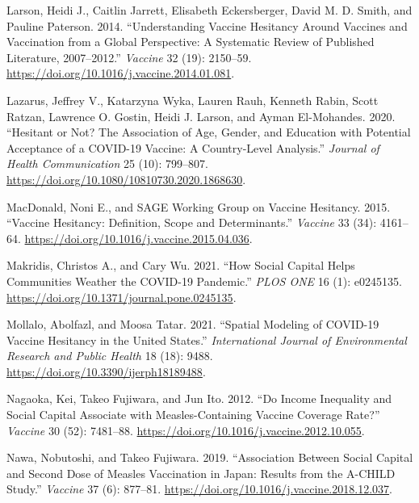 \documentclass[
]{article}
\newlength{\cslhangindent}
\newlength{\cslentryspacingunit} %
\newenvironment{CSLReferences}[2] %
 {%
  \setlength{\parindent}{0pt}
  \ifodd #1
  \let\oldpar\par
  \def\par{\hangindent=\cslhangindent\oldpar}
  \fi
  \setlength{\parskip}{#2\cslentryspacingunit}
 }%
 {}
\begin{document}
\begin{CSLReferences}{1}{0}
\leavevmode{}%
Larson, Heidi J., Caitlin Jarrett, Elisabeth Eckersberger, David M. D.
Smith, and Pauline Paterson. 2014. {``Understanding Vaccine Hesitancy
Around Vaccines and Vaccination from a Global Perspective: {A}
Systematic Review of Published Literature, 2007--2012.''} \emph{Vaccine}
32 (19): 2150--59. \url{https://doi.org/10.1016/j.vaccine.2014.01.081}.

\leavevmode{}%
Lazarus, Jeffrey V., Katarzyna Wyka, Lauren Rauh, Kenneth Rabin, Scott
Ratzan, Lawrence O. Gostin, Heidi J. Larson, and Ayman El-Mohandes.
2020. {``Hesitant or {Not}? {The} {Association} of {Age}, {Gender}, and
{Education} with {Potential} {Acceptance} of a {COVID}-19 {Vaccine}: {A}
{Country}-Level {Analysis}.''} \emph{Journal of Health Communication} 25
(10): 799--807. \url{https://doi.org/10.1080/10810730.2020.1868630}.

\leavevmode{}%
MacDonald, Noni E., and SAGE Working Group on Vaccine Hesitancy. 2015.
{``Vaccine Hesitancy: {Definition}, Scope and Determinants.''}
\emph{Vaccine} 33 (34): 4161--64.
\url{https://doi.org/10.1016/j.vaccine.2015.04.036}.

\leavevmode{}%
Makridis, Christos A., and Cary Wu. 2021. {``How Social Capital Helps
Communities Weather the {COVID}-19 Pandemic.''} \emph{PLOS ONE} 16 (1):
e0245135. \url{https://doi.org/10.1371/journal.pone.0245135}.

\leavevmode{}%
Mollalo, Abolfazl, and Moosa Tatar. 2021. {``Spatial {Modeling} of
{COVID}-19 {Vaccine} {Hesitancy} in the {United} {States}.''}
\emph{International Journal of Environmental Research and Public Health}
18 (18): 9488. \url{https://doi.org/10.3390/ijerph18189488}.

\leavevmode{}%
Nagaoka, Kei, Takeo Fujiwara, and Jun Ito. 2012. {``Do Income Inequality
and Social Capital Associate with Measles-Containing Vaccine Coverage
Rate?''} \emph{Vaccine} 30 (52): 7481--88.
\url{https://doi.org/10.1016/j.vaccine.2012.10.055}.

\leavevmode{}%
Nawa, Nobutoshi, and Takeo Fujiwara. 2019. {``Association Between Social
Capital and Second Dose of Measles Vaccination in {Japan}: {Results}
from the {A}-{CHILD} Study.''} \emph{Vaccine} 37 (6): 877--81.
\url{https://doi.org/10.1016/j.vaccine.2018.12.037}.


\end{CSLReferences}
\end{document}
